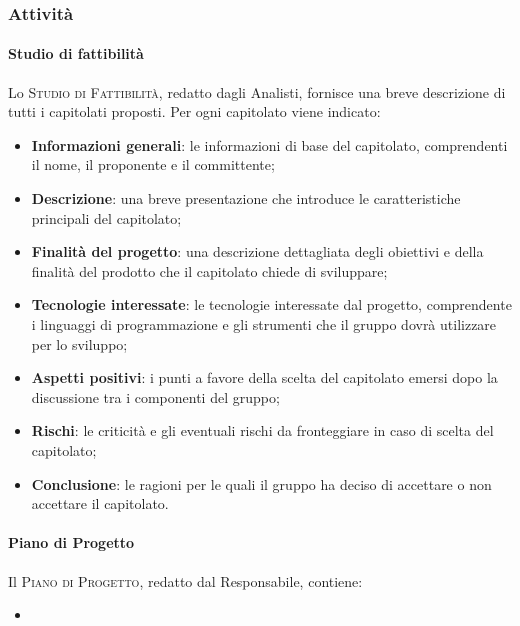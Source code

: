 \documentclass[../norme-di-progetto.tex]{subfiles}
\begin{document}
\subsubsection{Attività}
\paragraph{Studio di fattibilità}
Lo \textsc{Studio di Fattibilità}, redatto dagli Analisti, fornisce una breve descrizione di tutti i capitolati proposti. Per ogni capitolato viene indicato:
\begin{itemize}
  \item \textbf{Informazioni generali}: le informazioni di base del capitolato, comprendenti il nome, il proponente e il committente;
  \item \textbf{Descrizione}: una breve presentazione che introduce le caratteristiche principali del capitolato;
  \item \textbf{Finalità del progetto}: una descrizione dettagliata degli obiettivi e della finalità del prodotto che il capitolato chiede di sviluppare;
  \item \textbf{Tecnologie interessate}: le tecnologie interessate dal progetto, comprendente i linguaggi di programmazione e gli strumenti che il gruppo dovrà utilizzare per lo sviluppo;
  \item \textbf{Aspetti positivi}: i punti a favore della scelta del capitolato emersi dopo la discussione tra i componenti del gruppo;
  \item \textbf{Rischi}: le criticità e gli eventuali rischi da fronteggiare in caso di scelta del capitolato;
  \item \textbf{Conclusione}: le ragioni per le quali il gruppo ha deciso di accettare o non accettare il capitolato.
\end{itemize}
\paragraph{Piano di Progetto}
Il \textsc{Piano di Progetto}, redatto dal Responsabile, contiene:
\begin{itemize}
  \item %
\end{itemize}
\end{document}
